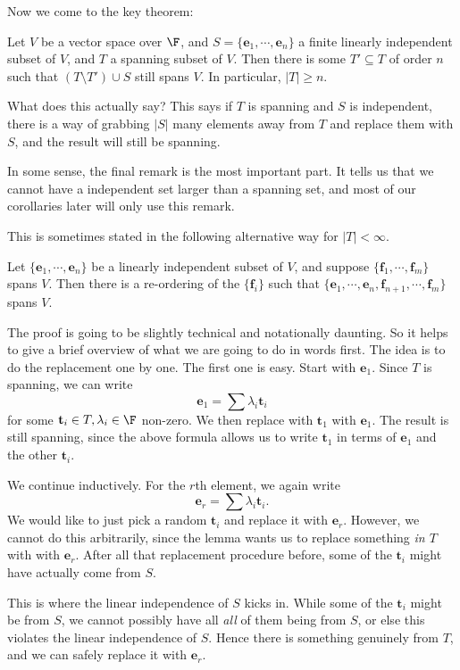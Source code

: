 \documentclass[a4paper]{article}
\begin{document}
Now we come to the key theorem:
\begin{thm}
  Let $V$ be a vector space over $\F$, and $S = \{\mathbf{e}_1, \cdots, \mathbf{e}_n\}$ a finite linearly independent subset of $V$, and $T$ a spanning subset of $V$. Then there is some $T'\subseteq T$ of order $n$ such that $(T\setminus T') \cup S$ still spans $V$. In particular, $|T| \geq n$.
\end{thm}
What does this actually say? This says if $T$ is spanning and $S$ is independent, there is a way of grabbing $|S|$ many elements away from $T$ and replace them with $S$, and the result will still be spanning.

In some sense, the final remark is the most important part. It tells us that we cannot have a independent set larger than a spanning set, and most of our corollaries later will only use this remark.

This is sometimes stated in the following alternative way for $|T| < \infty$.
\begin{cor}
  Let $\{\mathbf{e}_1, \cdots, \mathbf{e}_n\}$ be a linearly independent subset of $V$, and suppose $\{\mathbf{f}_1, \cdots, \mathbf{f}_m\}$ spans $V$. Then there is a re-ordering of the $\{\mathbf{f}_i\}$ such that $\{\mathbf{e}_1,\cdots, \mathbf{e}_n, \mathbf{f}_{n + 1}, \cdots, \mathbf{f}_m\}$ spans $V$.
\end{cor}

The proof is going to be slightly technical and notationally daunting. So it helps to give a brief overview of what we are going to do in words first. The idea is to do the replacement one by one. The first one is easy. Start with $\mathbf{e}_1$. Since $T$ is spanning, we can write
\[
  \mathbf{e}_1 = \sum \lambda_i \mathbf{t}_i
\]
for some $\mathbf{t}_i \in T, \lambda_i \in \F$ non-zero. We then replace with $\mathbf{t}_1$ with $\mathbf{e}_1$. The result is still spanning, since the above formula allows us to write $\mathbf{t}_1$ in terms of $\mathbf{e}_1$ and the other $\mathbf{t}_i$.

We continue inductively. For the $r$th element, we again write
\[
  \mathbf{e}_r = \sum \lambda_i \mathbf{t}_i.
\]
We would like to just pick a random $\mathbf{t}_i$ and replace it with $\mathbf{e}_r$. However, we cannot do this arbitrarily, since the lemma wants us to replace something \emph{in $T$} with with $\mathbf{e}_r$. After all that replacement procedure before, some of the $\mathbf{t}_i$ might have actually come from $S$.

This is where the linear independence of $S$ kicks in. While some of the $\mathbf{t}_i$ might be from $S$, we cannot possibly have all \emph{all} of them being from $S$, or else this violates the linear independence of $S$. Hence there is something genuinely from $T$, and we can safely replace it with $\mathbf{e}_r$.
\end{document}
